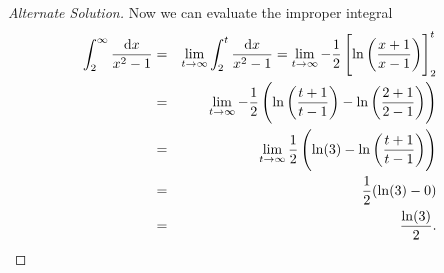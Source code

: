 \documentclass[12pt]{amsart}
\begin{document}
\begin{proof}[Alternate Solution]
  Now we can evaluate the improper integral
  \begin{eqnarray*}
    \int_2^\infty \frac{\dif x}{x^2 - 1} &=& \lim_{t \to \infty} \int_2^t \frac{\dif x}{x^2 - 1} = \lim_{t \to \infty} -\frac{1}{2}\left[\ln\left(\frac{x + 1}{x - 1}\right)\right]_2^t\\
    &=& \lim_{t \to \infty} -\frac{1}{2}\left(\ln\left(\frac{t + 1}{t - 1}\right) - \ln\left(\frac{2 + 1}{2 - 1}\right)\right)\\
    &=& \lim_{t \to \infty} \frac{1}{2}\left(\ln(3) - \ln\left(\frac{t + 1}{ t - 1}\right)\right)\\
    &=& \frac{1}{2}(\ln(3) - 0)\\
    &=& \frac{\ln(3)}{2}.
  \end{eqnarray*}
\end{proof}



\end{document}
